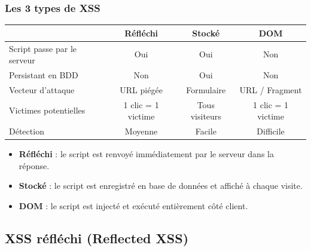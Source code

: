 \documentclass{beamer}
\def\emptyline{\vspace{10pt}}
\begin{document}
\begin{frame}
\frametitle{Les 3 types de XSS}

\begin{scriptsize}
\begin{tabular}{|p{3.2cm}|c|c|c|}
\hline
& \textbf{Réfléchi} & \textbf{Stocké} & \textbf{DOM} \\
\hline
Script passe par le serveur & Oui & Oui & \alert{Non} \\
\hline
Persistant en BDD & Non & \alert{Oui} & Non \\
\hline
Vecteur d'attaque & URL piégée & Formulaire & URL / Fragment \\
\hline
Victimes potentielles & 1 clic = 1 victime & Tous visiteurs & 1 clic = 1 victime \\
\hline
Détection & Moyenne & Facile & Difficile \\
\hline
\end{tabular}
\end{scriptsize}

\emptyline
\begin{itemize}
\item \textbf{Réfléchi} : le script est renvoyé immédiatement par le serveur dans la réponse.
\item \textbf{Stocké} : le script est enregistré en base de données et affiché à chaque visite.
\item \textbf{DOM} : le script est injecté et exécuté entièrement côté client.
\end{itemize}
\end{frame}


\subsection{XSS réfléchi (Reflected XSS)}
\end{document}

